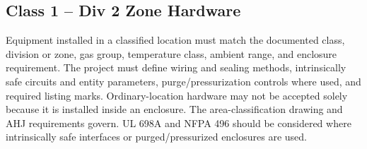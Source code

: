 \subsection{Class 1 -- Div 2 Zone Hardware}
Equipment installed in a classified location must match the documented class, division or zone, gas group, temperature class, ambient range, and enclosure requirement. The project must define wiring and sealing methods, intrinsically safe circuits and entity parameters, purge/pressurization controls where used, and required listing marks. Ordinary-location hardware may not be accepted solely because it is installed inside an enclosure. The area-classification drawing and AHJ requirements govern. UL 698A and NFPA 496 should be considered where intrinsically safe interfaces or purged/pressurized enclosures are used.
